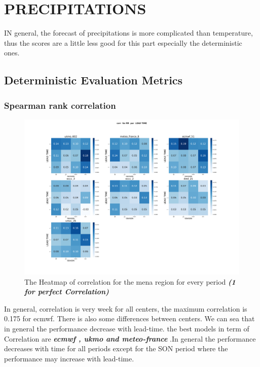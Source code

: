 \section{PRECIPITATIONS}




IN general, the forecast of precipitations is more complicated than temperature, thus the scores are a little less good for this part especially the deterministic ones. 



\subsection{Deterministic Evaluation Metrics}

\subsubsection{Spearman rank correlation}

\begin{figure}[H]
	\centering
	\includegraphics[scale=0.25]{plots/det/corr/corr_RR.png}
	\caption{The Heatmap of correlation for the mena region for every period \textbf{\textit{(1 for perfect Correlation)} }}
\end{figure}
In general, correlation is very week for all centers, the maximum correlation is 0.175 for ecmwf. There is also some differences between centers. We can sea that in general the performance decrease with lead-time. the best models in term of Correlation are \textbf{\textit{ecmwf , ukmo and meteo-france}} .In general the performance decreases with time for all periods except for the SON period where the performance may increase with lead-time. 



